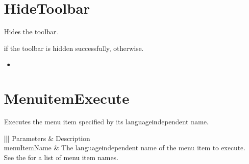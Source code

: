\documentclass[letterpaper,12pt,english,openany,oneside]{sphinxmanual}
\begin{document}
\section{HideToolbar}
\label{\detokenize{IAC_API_DDE_Messages:id44}}
Hides the toolbar.


\begin{sphinxVerbatim}[commandchars=\\\{\}]
\PYG{p}{[}\PYG{p}{]}
\end{sphinxVerbatim}


 if the toolbar is hidden successfully,  otherwise.

\label{\detokenize{IAC_API_DDE_Messages:related-methods-27}}
\begin{itemize}
\item {} 

\end{itemize}




\section{MenuitemExecute}
\label{\detokenize{IAC_API_DDE_Messages:id45}}
Executes the menu item specified by its language\sphinxhyphen{}independent name.


\begin{sphinxVerbatim}[commandchars=\\\{\}]
\PYG{p}{[} \PYG{p}{]}
\end{sphinxVerbatim}
\label{\detokenize{IAC_API_DDE_Messages:parameters-26}}


\begin{savenotes}\sphinxattablestart
\centering
{}\label{\detokenize{IAC_API_DDE_Messages:section-26}}\nobreak
\begin{tabular}[t]{|||}
\hline
\sphinxstyletheadfamily 
Parameters
&\sphinxstyletheadfamily 
Description
\\
\hline
menuItemName
&
The language\sphinxhyphen{}independent name of the menu item to execute. See the  for a list of menu item names.
\\
\hline
\end{tabular}
\par
\sphinxattableend\end{savenotes}
\end{document}
